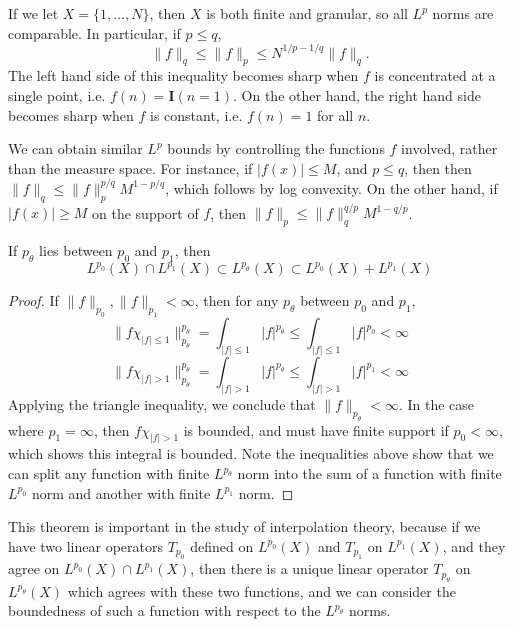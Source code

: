 \begin{remark}
  If we let $X = \{ 1, \dots, N \}$, then $X$ is both finite and granular, so all $L^p$ norms are comparable. In particular, if $p \leq q$,
  \[ \| f \|_q \leq \| f \|_p \leq N^{1/p - 1/q} \| f \|_q. \]
  The left hand side of this inequality becomes sharp when $f$ is concentrated at a single point, i.e. $f(n) = \mathbf{I}(n = 1)$. On the other hand, the right hand side becomes sharp when $f$ is constant, i.e. $f(n) = 1$ for all $n$.
\end{remark}

\begin{example}
    We can obtain similar $L^p$ bounds by controlling the functions $f$ involved, rather than the measure space. For instance, if $|f(x)| \leq M$, and $p \leq q$, then then $\| f \|_q \leq \| f \|_p^{p/q} M^{1 - p/q}$, which follows by log convexity. On the other hand, if $|f(x)| \geq M$ on the support of $f$, then $\| f \|_p \leq \| f \|_q^{q/p} M^{1-q/p}$.
\end{example}

\begin{theorem}
  If $p_\theta$ lies between $p_0$ and $p_1$, then
  \[ L^{p_0}(X) \cap L^{p_1}(X) \subset L^{p_\theta}(X) \subset L^{p_0}(X) + L^{p_1}(X) \]
\end{theorem}
\begin{proof}
  If $\| f \|_{p_0}, \| f \|_{p_1} < \infty$, then for any $p_\theta$ between $p_0$ and $p_1$,
  \[ \| f \chi_{|f| \leq 1} \|_{p_\theta}^{p_\theta} = \int_{|f| \leq 1} |f|^{p_\theta} \leq \int_{|f| \leq 1} |f|^{p_0} < \infty \]
  \[ \| f \chi_{|f| > 1} \|_{p_\theta}^{p_\theta} = \int_{|f| > 1} |f|^{p_\theta} \leq \int_{|f| > 1} |f|^{p_1} < \infty \]
  Applying the triangle inequality, we conclude that $\| f \|_{p_\theta} < \infty$. In the case where $p_1 = \infty$, then $f \chi_{|f| > 1}$ is bounded, and must have finite support if $p_0 < \infty$, which shows this integral is bounded. Note the inequalities above show that we can split any function with finite $L^{p_\theta}$ norm into the sum of a function with finite $L^{p_0}$ norm and another with finite $L^{p_1}$ norm.
\end{proof}

\begin{remark}
  This theorem is important in the study of interpolation theory, because if we have two linear operators $T_{p_0}$ defined on $L^{p_0}(X)$ and $T_{p_1}$ on $L^{p_1}(X)$, and they agree on $L^{p_0}(X) \cap L^{p_1}(X)$, then there is a unique linear operator $T_{p_\theta}$ on $L^{p_\theta}(X)$ which agrees with these two functions, and we can consider the boundedness of such a function with respect to the $L^{p_\theta}$ norms.
\end{remark}

